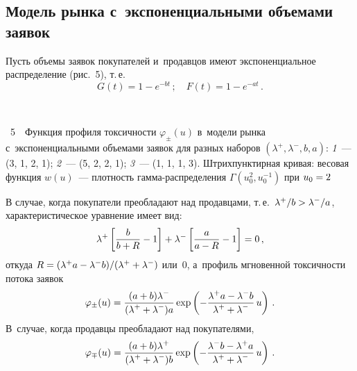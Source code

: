 \begin{multicols}{2}
\vspace*{-3pt}

\subsection{Модель рынка с~экспоненциальными объемами заявок}

Пусть объемы заявок покупателей и~продавцов имеют экспоненциальное распределение
(рис.~5),
т.\,е.\
$$
G(t) = 1 - e^{-bt}\,; \quad F(t) = 1 - e^{-at}\,.
$$

\begin{center}  %
\vspace*{6pt}
  \mbox{%
 \epsfxsize=78.264mm
 }
\end{center}

\vspace*{-5pt}

\noindent
{{\figurename~5}\ \ \small{Функция профиля токсичности $\varphi_{\pm}(u)$ в~модели рынка
    с~экспоненциальными объемами заявок для разных наборов
    $(\lambda^+, \lambda^-, b, a)$:
    \textit{1}~--- (3, 1, 2, 1); \textit{2}~--- (5, 2, 2, 1);
    \textit{3}~--- (1, 1, 1, 3).
Штрихпунктирная кривая: весовая функция $w(u)$~---
    плот\-ность гам\-ма-рас\-пре\-де\-ле\-ния $\Gamma(u_0^2, u_0^{-1})$ при
    $u_0 \hm= 2$ }}

    \columnbreak






\addtocounter{figure}{1}



\noindent
В случае, когда покупатели преобладают над продавцами, т.\,е.\
$\lambda^+ / b \hm> \lambda^- / a$, характеристическое уравнение имеет
вид:
$$
\lambda^+ \left[ \displaystyle\frac{\displaystyle b\mathstrut}{\displaystyle b + R\mathstrut} - 1 \right] + \lambda^- \left[ \displaystyle\frac{\displaystyle a\mathstrut}{\displaystyle a - R\mathstrut} -
1 \right] = 0\,,
$$
откуда $R = (\lambda^+ a \hm- \lambda^- b) / (\lambda^+ \hm+ \lambda^-)$ или~0,
а~профиль мгновенной токсичности потока заявок~\cite{Boykov2002}
$$
\varphi_{\pm}(u) = \displaystyle\frac{\displaystyle (a + b) \lambda^-\mathstrut}{\displaystyle (\lambda^+ + \lambda^-) a\mathstrut} \exp
\left( -\displaystyle\frac{\displaystyle \lambda^+ a - \lambda^- b\mathstrut}{\displaystyle \lambda^+ + \lambda^-\mathstrut}\, u \right)\,.
$$
В~случае, когда продавцы преобладают над покупателями,
$$
\varphi_{\mp}(u) = \displaystyle\frac{\displaystyle (a + b) \lambda^+\mathstrut}{\displaystyle (\lambda^+ + \lambda^-) b\mathstrut}
\exp \left( -\displaystyle\frac{\displaystyle \lambda^- b - \lambda^+ a\mathstrut}{\displaystyle \lambda^+ + \lambda^-\mathstrut}
\,u \right)\,.
$$








\end{multicols}

